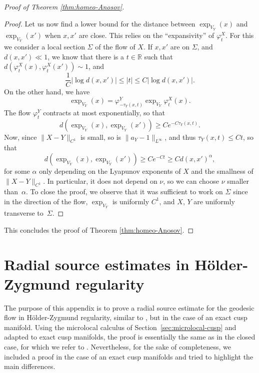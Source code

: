 \documentclass[10pt]{amsart}
\newcommand{\R}{\mathbb{R}}
\theoremstyle{plain}
\theoremstyle{definition}
\begin{document}
\begin{proof}[Proof of Theorem \ref{thm:homeo-Anosov}]
\begin{proof}
Let us now find a lower bound for the distance between $\exp_{V_Y}(x)$ and $\exp_{V_Y}(x')$ when $x,x'$ are close. This relies on the ``expansivity'' of $\varphi^X_t$. For this we consider a local section $\Sigma$ of the flow of $X$. If $x,x'$ are on $\Sigma$, and $d(x,x') \ll 1$, we know that there is a $t\in \R$ such that $d(\varphi_t^X(x),\varphi^X_t(x')) \sim 1$, and
\[
\frac{1}{C}|\log d(x,x')| \leq |t| \leq C |\log d(x,x')|.
\]
On the other hand, we have
\[
\exp_{V_Y}(x) = \varphi^Y_{-\tau_Y(x,t)} \exp_{V_Y} \varphi^X_t(x).
\]
The flow $\varphi^Y_t$ contracts at most exponentially, so that
\[
d(\exp_{V_Y}(x), \exp_{V_Y}(x')) \geq C e^{- C\tau_Y(x,t)}.
\]
Now, since $\|X-Y\|_{C^1}$ is small, so is $\| a_Y - 1\|_{L^\infty}$, and thus $\tau_Y(x,t)\leq Ct$, so that
\[
d(\exp_{V_Y}(x), \exp_{V_Y}(x')) \geq C e^{- C t}\geq C d(x,x')^{\alpha},
\]
for some $\alpha$ only depending on the Lyapunov exponents of $X$ and the smallness of $\|X-Y\|_{C^1}$. In particular, it does not depend on $\nu$, so we can choose $\nu$ smaller than~$\alpha$. To close the proof, we observe that it was sufficient to work on $\Sigma$ since in the direction of the flow, $\exp_{V_Y}$ is uniformly $C^1$, and $X$, $Y$ are uniformly transverse to~$\Sigma$.
\end{proof}

This concludes the proof of Theorem \ref{thm:homeo-Anosov}.
\end{proof}

\section{Radial source estimates in Hölder-Zygmund regularity}

\label{section:radial}

The purpose of this appendix is to prove a radial source estimate for the geodesic flow in Hölder-Zygmund regularity, similar to \cite{Bonthonneau-Lefeuvre-21}, but in the case of an exact cusp manifold. Using the microlocal calculus of Section~\ref{sec:microlocal-cusp} and adapted to exact cusp manifolds, the proof is essentially the same as in the closed case, for which we refer to \cite{Bonthonneau-Lefeuvre-21}. Nevertheless, for the sake of completeness, we included a proof in the case of an exact cusp manifolds and tried to highlight the main differences.
\end{document}
